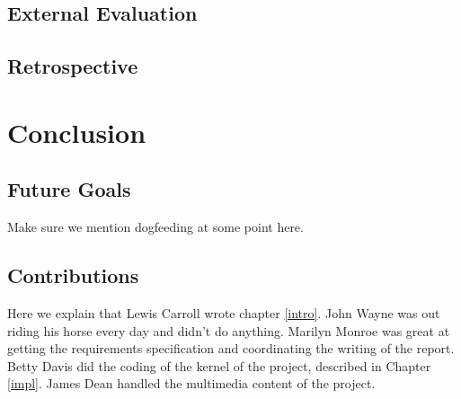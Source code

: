 \documentclass[a4paper]{l3proj}
\begin{document}
\section{External Evaluation}


\section{Retrospective}


\chapter{Conclusion}


\section{Future Goals}

Make sure we mention dogfeeding at some point here.

\section{Contributions}

Here we explain that Lewis Carroll wrote chapter \ref{intro}. John Wayne
was out riding his horse every day and didn't do anything. Marilyn Monroe
was great at getting the requirements specification and coordinating the
writing of the report. Betty Davis did the coding of the kernel of the
project, described in Chapter \ref{impl}.  James Dean handled the
multimedia content of the project.



\end{document}
